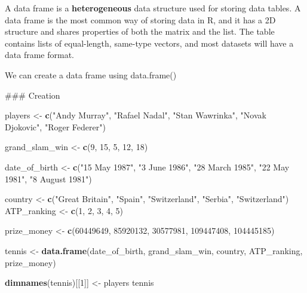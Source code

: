 \documentclass[12pt,]{krantz}
\newenvironment{Shaded}{\begin{snugshade}}{\end{snugshade}}
\newcommand{\KeywordTok}[1]{\textcolor[rgb]{0.27,0.27,0.27}{\textbf{#1}}}
\newcommand{\DecValTok}[1]{\textcolor[rgb]{0.06,0.06,0.06}{#1}}
\newcommand{\StringTok}[1]{\textcolor[rgb]{0.5,0.5,0.5}{#1}}
\newcommand{\NormalTok}[1]{#1}
\begin{document}
A data frame is a \textbf{heterogeneous} data structure used for storing
data tables. A data frame is the most common way of storing data in R,
and it has a 2D structure and shares properties of both the matrix and
the list. The table contains lists of equal-length, same-type vectors,
and most datasets will have a data frame format.

We can create a data frame using data.frame()

\begin{Shaded}
\begin{Highlighting}[]
\NormalTok{### Creation}

\NormalTok{players <-}\StringTok{ }\KeywordTok{c}\NormalTok{(}\StringTok{"Andy Murray"}\NormalTok{, }\StringTok{"Rafael Nadal"}\NormalTok{, }\StringTok{"Stan Wawrinka"}\NormalTok{, }
             \StringTok{"Novak Djokovic"}\NormalTok{, }\StringTok{"Roger Federer"}\NormalTok{)}

\NormalTok{grand_slam_win <-}\StringTok{ }\KeywordTok{c}\NormalTok{(}\DecValTok{9}\NormalTok{, }\DecValTok{15}\NormalTok{, }\DecValTok{5}\NormalTok{, }\DecValTok{12}\NormalTok{, }\DecValTok{18}\NormalTok{)}

\NormalTok{date_of_birth <-}\StringTok{ }\KeywordTok{c}\NormalTok{(}\StringTok{"15 May 1987"}\NormalTok{, }\StringTok{"3 June 1986"}\NormalTok{, }\StringTok{"28 March 1985"}\NormalTok{, }
                  \StringTok{"22 May 1981"}\NormalTok{, }\StringTok{"8 August 1981"}\NormalTok{)}

\NormalTok{country <-}\StringTok{ }\KeywordTok{c}\NormalTok{(}\StringTok{"Great Britain"}\NormalTok{, }\StringTok{"Spain"}\NormalTok{, }\StringTok{"Switzerland"}\NormalTok{, }
            \StringTok{"Serbia"}\NormalTok{, }\StringTok{"Switzerland"}\NormalTok{)}
\NormalTok{ATP_ranking <-}\StringTok{ }\KeywordTok{c}\NormalTok{(}\DecValTok{1}\NormalTok{, }\DecValTok{2}\NormalTok{, }\DecValTok{3}\NormalTok{, }\DecValTok{4}\NormalTok{, }\DecValTok{5}\NormalTok{)}

\NormalTok{prize_money <-}\StringTok{ }\KeywordTok{c}\NormalTok{(}\DecValTok{60449649}\NormalTok{, }\DecValTok{85920132}\NormalTok{, }\DecValTok{30577981}\NormalTok{, }\DecValTok{109447408}\NormalTok{, }\DecValTok{104445185}\NormalTok{)}

\NormalTok{tennis <-}\StringTok{ }\KeywordTok{data.frame}\NormalTok{(date_of_birth, grand_slam_win, country, }
\NormalTok{                    ATP_ranking, prize_money)}

\KeywordTok{dimnames}\NormalTok{(tennis)[[}\DecValTok{1}\NormalTok{]] <-}\StringTok{ }\NormalTok{players}
\NormalTok{tennis}
\end{Highlighting}
\end{Shaded}
\end{document}
